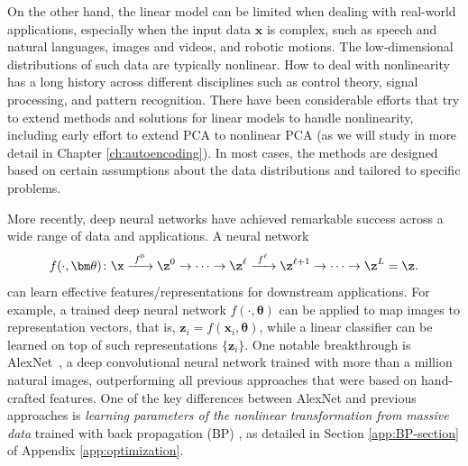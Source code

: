 \documentclass[../../book-main.tex]{subfiles}
\begin{document}
On the other hand, the linear model can be limited when dealing with real-world applications, especially when the input data $\bm{x}$ is complex, such as speech and natural languages, images and videos, and robotic motions. The low-dimensional distributions of such data are typically nonlinear. 
How to deal with nonlinearity has a long history across different disciplines such as control theory, signal processing, and pattern recognition.  There have been considerable efforts that try to extend methods and solutions for linear models to handle nonlinearity, including early effort to extend PCA to nonlinear PCA (as we will study in more detail in Chapter \ref{ch:autoencoding}).  In most cases, the methods are designed based on certain assumptions about the data distributions and tailored to specific problems. 

More recently, deep neural networks have achieved remarkable success across a wide range of data and applications. A neural network
\begin{equation}
  f(\cdot, \bm \theta) \colon \x
  \xrightarrow{\hspace{1mm} f^0 \hspace{1mm}} \z^0 \rightarrow \cdots
  \rightarrow \z^\ell \xrightarrow{\hspace{1mm} f^\ell \hspace{1mm}}
  \z^{\ell+1} \rightarrow  \cdots \to \z^L = \z.
\end{equation}
can learn effective features/representations for downstream applications. For example, a trained deep neural network $f(\cdot, \bm \theta)$ can be applied to map images to representation vectors, that is, $\bm{z}_i = f(\bm{x}_i,\bm \theta)$, while a linear classifier can be learned on top of such representations $\{\bm{z}_i\}$. One notable breakthrough is AlexNet~\cite{krizhevsky2012imagenet}, a deep convolutional neural network trained with more than a million natural images, outperforming all previous approaches that were based on hand-crafted features. One of the key differences between AlexNet and previous approaches is \textit{learning parameters of the nonlinear transformation from massive data} trained with back propagation (BP) \cite{Back-Prop}, as detailed in Section \ref{app:BP-section} of Appendix \ref{app:optimization}. 


\end{document}
